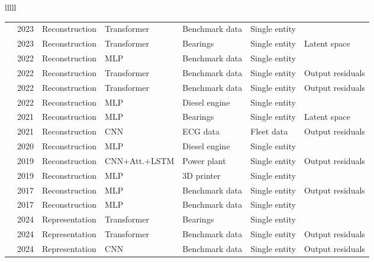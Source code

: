 \begin{landscape}
\begin{longtable}{lllll}
\begin{tabular}{lllllll}
\cite{yangDDMTDenoisingDiffusion2023} & 2023 & Reconstruction & Transformer & Benchmark data & Single entity & \texttimes \\
\cite{yangSelfSupervisedLearningSignal2023} & 2023 & Reconstruction & Transformer & Bearings & Single entity & Latent space \\
\cite{gargEvaluationAnomalyDetection2022} & 2022 & Reconstruction & MLP & Benchmark data & Single entity & \texttimes \\
\cite{tuliTranADDeepTransformer2022} & 2022 & Reconstruction & Transformer & Benchmark data & Single entity & Output residuals \\
\cite{xuAnomalyTransformerTime2022} & 2022 & Reconstruction & Transformer & Benchmark data & Single entity & Output residuals \\
\cite{yuFastAdaptionMulti2022} & 2022 & Reconstruction & MLP & Diesel engine & Single entity & \texttimes \\
\cite{arellano-espitiaDeepCompactClusteringBasedAnomaly2021} & 2021 & Reconstruction & MLP & Bearings & Single entity & Latent space \\
\cite{thillTemporalConvolutionalAutoencoder2021} & 2021 & Reconstruction & CNN & ECG data & Fleet data & Output residuals \\
\cite{ellefsenOnlineFaultDetection2020} & 2020 & Reconstruction & MLP & Diesel engine & Single entity & \texttimes \\
\cite{zhangDeepNeuralNetwork2019} & 2019 & Reconstruction & CNN+Att.+LSTM & Power plant & Single entity & Output residuals \\
\cite{zhangDynamicConditionMonitoring2019} & 2019 & Reconstruction & MLP & 3D printer & Single entity & \texttimes \\
\cite{shipmonTimeSeriesAnomaly2017} & 2017 & Reconstruction & MLP & Benchmark data & Single entity & Output residuals \\
\cite{zhouAnomalyDetectionRobust2017} & 2017 & Reconstruction & MLP & Benchmark data & Single entity & \texttimes \\
\cite{kangFaultAnomalyDetection2024} & 2024 & Representation & Transformer & Bearings & Single entity & \texttimes \\
\cite{leeExplainableTimeSeries2024} & 2024 & Representation & Transformer & Benchmark data & Single entity & Output residuals \\
\cite{milkovicFRAnomalyFlowbasedRapid2024} & 2024 & Representation & CNN & Benchmark data & Single entity & Output residuals \\

\end{tabular}
\end{longtable}
\end{landscape}
